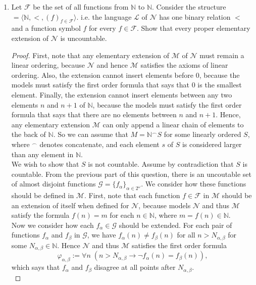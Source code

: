 \documentclass{article}
\begin{document}
\begin{enumerate}[label={\bf Q\arabic*:}]
\begin{enumerate}
      \item Let $\mathcal{F}$ be the set of all functions from $\mathbb{N}$
        to $\mathbb{N}$. Consider the structure
        $\mathcal=\langle\mathbb{N},<,(f)_{f\in\mathcal{F}}\rangle$. i.e. the
        language $\mathcal{L}$ of $\mathcal{N}$ has one binary relation $<$
        and a function symbol $f$ for every $f\in\mathcal{F}$. Show that
        every proper elementary extension of $\mathcal{N}$ is uncountable.

        \begin{proof}
          First, note that any elementary extension of $\mathcal{M}$ of
          $\mathcal{N}$ must remain a linear ordering, because
          $\mathcal{N}$ and hence $\mathcal{M}$ satisfies the axioms of
          linear ordering. Also, the extension cannot insert elements
          before $0$, because the models must satisfy the first order
          formula that says that $0$ is the smallest element. Finally, the
          extension cannot insert elements between any two elements $n$ and
          $n+1$ of $\mathbb{N}$, because the models must satisfy the first
          order formula that says that there are no elements between $n$
          and $n+1$. Hence, any elementary extension $\mathcal{M}$ can only
          append a linear chain of elements to the back of $\mathbb{N}$. So
          we can assume that $M=\mathbb{N}^\frown S$ for some linearly
          ordered $S$, where $^\frown$ denotes concatenate, and each
          element $s$ of $S$ is considered larger than any element in
          $\mathbb{N}$. \\

          We wish to show that $S$ is not countable. Assume by
          contradiction that $S$ is countable. From the previous part of
          this question, there is an uncoutable set of almost disjoint
          functions $\mathcal{G}=\{f_{\alpha}\}_{\alpha\in2^\omega}$. We
          consider how these functions should be defined in $\mathcal{M}$.
          First, note that each function $f\in\mathcal{F}$ in $\mathcal{M}$
          should be an extension of itself when defined for $\mathcal{N}$,
          because models $\mathcal{N}$ and thus $\mathcal{M}$ satisfy the
          formula $f(n)=m$ for each $n\in\mathbb{N}$, where
          $m=f(n)\in\mathbb{N}$. \\
          
          Now we consider how each $f_\alpha\in\mathcal{G}$ should be
          extended. For each pair of functions $f_\alpha$ and
          $f_\beta$ in $\mathcal{G}$, we have $f_\alpha(n)\neq f_\beta(n)$
          for all $n>N_{\alpha,\beta}$ for some
          $N_{\alpha,\beta}\in\mathbb{N}$.  Hence $\mathcal{N}$ and thus
          $\mathcal{M}$ satisfies the first order formula
          \begin{equation*}
            \varphi_{\alpha,\beta} := \forall n\;
            (n>N_{\alpha,\beta}\rightarrow \neg f_\alpha(n)=f_\beta(n)),
          \end{equation*}
          which says that $f_\alpha$ and $f_\beta$ disagree at all points
          after $N_{\alpha,\beta}$. \\


\end{proof}
\end{enumerate}
\end{enumerate}
\end{document}
